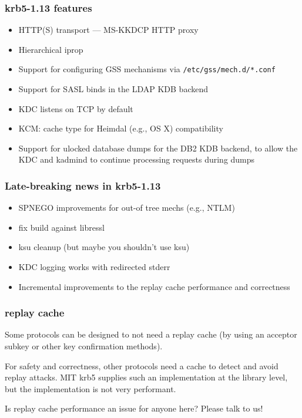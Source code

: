\documentclass{beamer}
\begin{document}
\begin{frame}
\frametitle{krb5-1.13 features}
\begin{itemize}
\item{HTTP(S) transport --- MS-KKDCP HTTP proxy}
\item{Hierarchical iprop}
\item{Support for configuring GSS mechanisms via \verb+/etc/gss/mech.d/*.conf+}
\item{Support for SASL binds in the LDAP KDB backend}
\item{KDC listens on TCP by default}
\item{KCM: cache type for Heimdal (e.g., OS X) compatibility}
\item{Support for ulocked database dumps for the DB2 KDB backend, to allow
	the KDC and kadmind to continue processing requests during dumps}
\end{itemize}
\end{frame}

\begin{frame}
\frametitle{Late-breaking news in krb5-1.13}
\begin{itemize}
\item{SPNEGO improvements for out-of tree mechs (e.g., NTLM)}
\item{fix build against libressl}
\item{ksu cleanup (but maybe you shouldn't use ksu)}
\item{KDC logging works with redirected stderr}
\item{Incremental improvements to the replay cache performance and
	correctness}
\end{itemize}
\end{frame}

\begin{frame}
\end{frame}

\begin{frame}
\frametitle{replay cache}
Some protocols can be designed to not need a replay cache (by using
an acceptor subkey or other key confirmation methods).

For safety and correctness, other protocols need a cache to detect and
avoid replay attacks.  MIT krb5 supplies such an implementation at the
library level, but the implementation is not very performant.

Is replay cache performance an issue for anyone here?  Please talk to us!
\end{frame}
\end{document}
